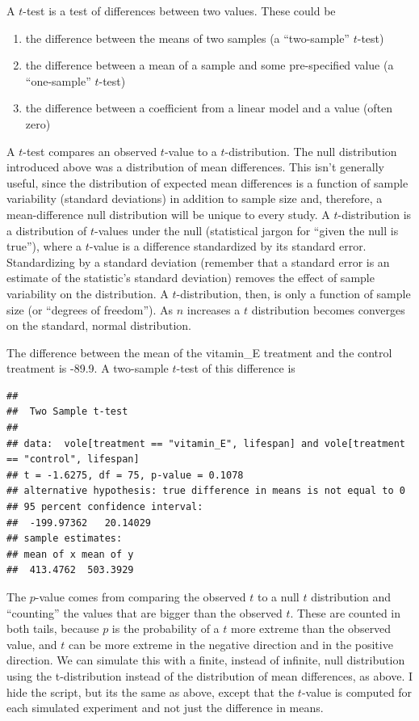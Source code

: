 \documentclass[]{book}
\providecommand{\tightlist}{%
  \setlength{\itemsep}{0pt}\setlength{\parskip}{0pt}}
\theoremstyle{definition}
\theoremstyle{definition}
\theoremstyle{definition}
\theoremstyle{remark}
\begin{document}
A \(t\)-test is a test of differences between two values. These could be

\begin{enumerate}
\def\labelenumi{\arabic{enumi}.}
\tightlist
\item
  the difference between the means of two samples (a ``two-sample''
  \(t\)-test)
\item
  the difference between a mean of a sample and some pre-specified value
  (a ``one-sample'' \(t\)-test)
\item
  the difference between a coefficient from a linear model and a value
  (often zero)
\end{enumerate}

A \(t\)-test compares an observed \(t\)-value to a \(t\)-distribution.
The null distribution introduced above was a distribution of mean
differences. This isn't generally useful, since the distribution of
expected mean differences is a function of sample variability (standard
deviations) in addition to sample size and, therefore, a mean-difference
null distribution will be unique to every study. A \(t\)-distribution is
a distribution of \(t\)-values under the null (statistical jargon for
``given the null is true''), where a \(t\)-value is a difference
standardized by its standard error. Standardizing by a standard
deviation (remember that a standard error is an estimate of the
statistic's standard deviation) removes the effect of sample variability
on the distribution. A \(t\)-distribution, then, is only a function of
sample size (or ``degrees of freedom''). As \(n\) increases a \(t\)
distribution becomes converges on the standard, normal distribution.

The difference between the mean of the vitamin\_E treatment and the
control treatment is -89.9. A two-sample \(t\)-test of this difference
is

\begin{verbatim}
## 
##  Two Sample t-test
## 
## data:  vole[treatment == "vitamin_E", lifespan] and vole[treatment == "control", lifespan]
## t = -1.6275, df = 75, p-value = 0.1078
## alternative hypothesis: true difference in means is not equal to 0
## 95 percent confidence interval:
##  -199.97362   20.14029
## sample estimates:
## mean of x mean of y 
##  413.4762  503.3929
\end{verbatim}

The \(p\)-value comes from comparing the observed \(t\) to a null \(t\)
distribution and ``counting'' the values that are bigger than the
observed \(t\). These are counted in both tails, because \(p\) is the
probability of a \(t\) more extreme than the observed value, and \(t\)
can be more extreme in the negative direction and in the positive
direction. We can simulate this with a finite, instead of infinite, null
distribution using the t-distribution instead of the distribution of
mean differences, as above. I hide the script, but its the same as
above, except that the \(t\)-value is computed for each simulated
experiment and not just the difference in means.
\end{document}
